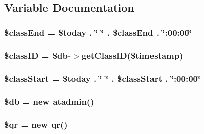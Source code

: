 \subsection{Variable Documentation}
\hypertarget{show_q_r_8php_a4abed065999cb36b961988a7bf6e48a0}{
\subsubsection[{\$class\-End}]{\setlength{\rightskip}{0pt plus 5cm}\$class\-End = \$today . \char`\"{} \char`\"{} . \$class\-End . \char`\"{}\-:00\-:00\char`\"{}}}\label{show_q_r_8php_a4abed065999cb36b961988a7bf6e48a0}
\hypertarget{show_q_r_8php_a48ffa401b856e5d2f7f4617bb2a8d580}{
\subsubsection[{\$class\-I\-D}]{\setlength{\rightskip}{0pt plus 5cm}\$class\-I\-D = \${\bf db}-\/$>$get\-Class\-I\-D(\$timestamp)}}\label{show_q_r_8php_a48ffa401b856e5d2f7f4617bb2a8d580}
\hypertarget{show_q_r_8php_a8290a94ec873262d279b188952321760}{
\subsubsection[{\$class\-Start}]{\setlength{\rightskip}{0pt plus 5cm}\$class\-Start = \$today . \char`\"{} \char`\"{} . \$class\-Start . \char`\"{}\-:00\-:00\char`\"{}}}\label{show_q_r_8php_a8290a94ec873262d279b188952321760}
\hypertarget{show_q_r_8php_a1fa3127fc82f96b1436d871ef02be319}{
\subsubsection[{\$db}]{\setlength{\rightskip}{0pt plus 5cm}\${\bf db} = new {\bf atadmin}()}}\label{show_q_r_8php_a1fa3127fc82f96b1436d871ef02be319}
\hypertarget{show_q_r_8php_a2357c56e11778cb14e3c86756ae724be}{
\subsubsection[{\$qr}]{\setlength{\rightskip}{0pt plus 5cm}\${\bf qr} = new {\bf qr}()}}\label{show_q_r_8php_a2357c56e11778cb14e3c86756ae724be}
